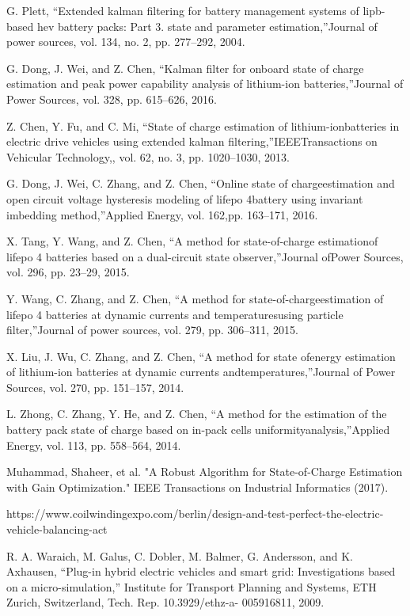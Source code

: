 G. Plett, “Extended  kalman  filtering  for  battery  management  systems  of lipb-based  hev  battery  packs:  Part  3.  state  and  parameter  estimation,”Journal of power sources, vol. 134, no. 2, pp. 277–292, 2004.

 G. Dong, J. Wei, and Z. Chen, “Kalman filter for onboard state of charge estimation and peak power capability analysis of lithium-ion batteries,”Journal of Power Sources, vol. 328, pp. 615–626, 2016.

Z.  Chen,  Y.  Fu,  and  C.  Mi,  “State  of  charge  estimation  of  lithium-ionbatteries in electric drive vehicles using extended kalman filtering,”IEEETransactions  on  Vehicular  Technology,,  vol.  62,  no.  3,  pp.  1020–1030, 2013.

 G.  Dong,  J.  Wei,  C.  Zhang,  and  Z.  Chen,  “Online  state  of  chargeestimation  and  open  circuit  voltage  hysteresis  modeling  of  lifepo  4battery  using  invariant  imbedding  method,”Applied  Energy,  vol.  162,pp. 163–171, 2016.

  X. Tang, Y. Wang, and Z. Chen, “A method for state-of-charge estimationof lifepo 4 batteries based  on a dual-circuit state observer,”Journal ofPower Sources, vol. 296, pp. 23–29, 2015.

  Y.  Wang,  C.  Zhang,  and  Z.  Chen,  “A  method  for  state-of-chargeestimation  of  lifepo  4  batteries  at  dynamic  currents  and  temperaturesusing particle filter,”Journal of power sources, vol. 279, pp. 306–311, 2015.

  X.  Liu,  J.  Wu,  C.  Zhang,  and  Z.  Chen,  “A  method  for  state  ofenergy  estimation  of  lithium-ion  batteries  at  dynamic  currents  andtemperatures,”Journal of Power Sources, vol. 270, pp. 151–157, 2014.

  L. Zhong, C. Zhang, Y. He, and Z. Chen, “A method for the estimation  of  the  battery  pack  state  of  charge  based  on  in-pack  cells  uniformityanalysis,”Applied Energy, vol. 113, pp. 558–564, 2014.
  
  Muhammad, Shaheer, et al. "A Robust Algorithm for State-of-Charge Estimation with Gain Optimization." IEEE Transactions on Industrial Informatics (2017).
  
  https://www.coilwindingexpo.com/berlin/design-and-test-perfect-the-electric-vehicle-balancing-act
  
  R. A. Waraich, M. Galus, C. Dobler, M. Balmer, G. Andersson, and K.
Axhausen, “Plug-in hybrid electric vehicles and smart grid: Investigations
based on a micro-simulation,” Institute for Transport Planning
and Systems, ETH Zurich, Switzerland, Tech. Rep. 10.3929/ethz-a-
005916811, 2009.

